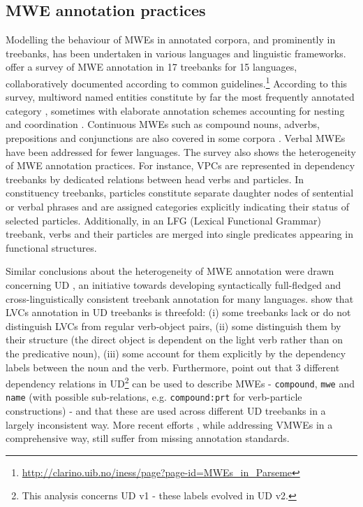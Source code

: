 \documentclass[output=paper,
modfonts,
]{langscibook}
\begin{document}
\subsection{MWE annotation practices}
\label{sec:related-practices}

Modelling the behaviour of MWEs in annotated corpora, and prominently in treebanks, has been undertaken in various languages and linguistic frameworks. \citet{rosen:hal-01226001} offer a survey of MWE annotation in 17 treebanks for 15 languages, collaboratively documented according to common guidelines.\footnote{{\scriptsize \url{http://clarino.uib.no/iness/page?page-id=MWEs_in_Parseme}}}  
According to this survey, multiword named entities constitute by far the most frequently annotated category \citep{erjavec2010jos}, sometimes with elaborate annotation schemes accounting for nesting and coordination \citep{savaryetal10}. Continuous MWEs such as compound nouns, adverbs, prepositions and conjunctions are also covered in some corpora \citep{abeille:2003:ftb,Laporteetal08a,branco2010}. Verbal MWEs 
have been addressed for fewer languages. The survey also shows the heterogeneity of MWE annotation practices. For instance, VPCs %
are represented in dependency treebanks by dedicated relations between head verbs and particles. In constituency treebanks, particles constitute separate daughter nodes of sentential or verbal phrases and are assigned categories explicitly indicating their status of selected particles. Additionally, in an LFG (Lexical Functional Grammar) treebank, verbs and their particles are merged into single predicates appearing in functional structures.


Similar conclusions about the heterogeneity of MWE annotation were drawn concerning UD \citep{mcdonald-EtAl:2013:Short}, an initiative towards developing syntactically full-fledged and cross-linguistically consistent treebank annotation for many languages. 
\citet{NivreVincze15} show that LVCs annotation in UD treebanks is threefold: (i) some treebanks lack or do not distinguish LVCs from regular verb-object pairs, (ii) some distinguish them by their structure (the direct object is dependent on the light verb rather than on the predicative noun), (iii) some account for them explicitly by the dependency labels between the noun and the verb. Furthermore, \citet{DeSmedtetal15} point out that 3 different dependency relations in UD\footnote{This analysis concerns UD v1 - these labels evolved in UD v2.} can be used to describe MWEs - \texttt{compound}, \texttt{mwe} and \texttt{name} (with possible sub-relations, e.g. \texttt{compound:prt} for verb-particle constructions) 
- and that these are used across different UD treebanks in a largely inconsistent way.  
More recent efforts \citep{ciclingkubra}, while addressing VMWEs in a comprehensive way, still suffer from missing annotation standards.
\end{document}
